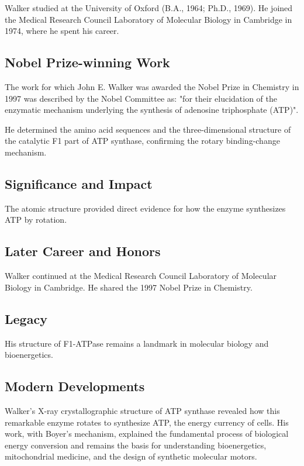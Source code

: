 Walker studied at the University of Oxford (B.A., 1964; Ph.D., 1969). He joined the Medical Research Council Laboratory of Molecular Biology in Cambridge in 1974, where he spent his career.

\subsection*{Nobel Prize-winning Work}

The work for which John E. Walker was awarded the Nobel Prize in Chemistry in 1997 was described by the Nobel Committee as: "for their elucidation of the enzymatic mechanism underlying the synthesis of adenosine triphosphate (ATP)".

He determined the amino acid sequences and the three-dimensional structure of the catalytic F1 part of ATP synthase, confirming the rotary binding-change mechanism.

\subsection*{Significance and Impact}

The atomic structure provided direct evidence for how the enzyme synthesizes ATP by rotation.

\subsection*{Later Career and Honors}

Walker continued at the Medical Research Council Laboratory of Molecular Biology in Cambridge. He shared the 1997 Nobel Prize in Chemistry.

\subsection*{Legacy}

His structure of F1-ATPase remains a landmark in molecular biology and bioenergetics.

\subsection*{Modern Developments}

Walker's X-ray crystallographic structure of ATP synthase revealed how this remarkable enzyme rotates to synthesize ATP, the energy currency of cells. His work, with Boyer's mechanism, explained the fundamental process of biological energy conversion and remains the basis for understanding bioenergetics, mitochondrial medicine, and the design of synthetic molecular motors.


